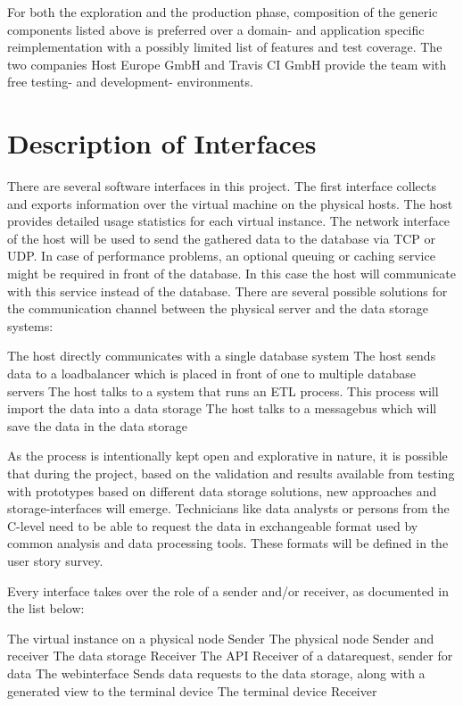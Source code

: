 For both the exploration and the production phase, composition of the generic
components listed above is preferred over a domain- and application specific
reimplementation with a possibly limited list of features and test coverage. The
two companies Host Europe GmbH and Travis CI GmbH provide the team with free
testing- and development- environments.

\section{Description of Interfaces}

There are several software interfaces in this project. The first interface
collects and exports information over the virtual machine on the physical hosts.
The host provides detailed usage statistics for each virtual instance. The
network interface of the host will be used to send the gathered data to the
database via TCP or UDP. In case of performance problems, an optional queuing or
caching service might be required in front of the database. In this case the
host will communicate with this service instead of the database. There are
several possible solutions for the communication channel between the physical
server and the data storage systems:

\begin{outline}
    \1 The host directly communicates with a single database system
    \1 The host sends data to a loadbalancer which is placed in front of one to multiple database servers
    \1 The host talks to a system that runs an ETL process. This process will import the data into a data storage
    \1 The host talks to a messagebus which will save the data in the data storage
\end{outline}
As the process is intentionally kept open and explorative in nature, it is
possible that during the project, based on the validation and results available
from testing with prototypes based on different data storage solutions, new
approaches and storage-interfaces will emerge. Technicians like data analysts or
persons from the C-level need to be able to request the data in exchangeable
format used by common analysis and data processing tools. These formats will be
defined in the user story survey.

Every interface takes over the role of a sender and/or receiver, as
documented in the list below:
\begin{outline}
    \1 The virtual instance on a physical node
        \2 Sender
    \1 The physical node
        \2 Sender and receiver
    \1 The data storage
        \2 Receiver
    \1 The API
        \2 Receiver of a datarequest, sender for data
    \1 The webinterface
        \2 Sends data requests to the data storage,  along with a generated view to the terminal device
    \1 The terminal device
        \2 Receiver
\end{outline}

